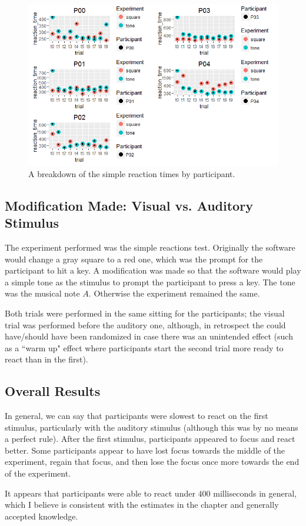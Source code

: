 \documentclass{article}
\begin{document}
\begin{figure}[h!]
\centering
\includegraphics[width=.65\linewidth]{participant-reaction}
\caption{A breakdown of the simple reaction times by participant.}
\label{fig:participant-reaction}
\end{figure}

\subsection{Modification Made: Visual vs. Auditory Stimulus}
The experiment performed was the simple reactions test. Originally the software would change a gray square to a red one, which was the prompt for the participant to hit a key. A modification was made so that the software would play a simple tone as the stimulus to prompt the participant to press a key. The tone was the musical note $A$. Otherwise the experiment remained the same.

Both trials were performed in the same sitting for the participants; the visual trial was performed before the auditory one, although, in retrospect the could have/should have been randomized in case there was an unintended effect (such as a ``warm up" effect where participants start the second trial more ready to react than in the first).

%
\subsection{Overall Results}
In general, we can say that participants were slowest to react on the first stimulus, particularly with the auditory stimulus (although this was by no means a perfect rule). After the first stimulus, participants appeared to focus and react better. Some participants appear to have lost focus towards the middle of the experiment, regain that focus, and then lose the focus once more towards the end of the experiment.

It appears that participants were able to react under $400$ milliseconds in general, which I believe is consistent with the estimates in the chapter and generally accepted knowledge.
\end{document}

